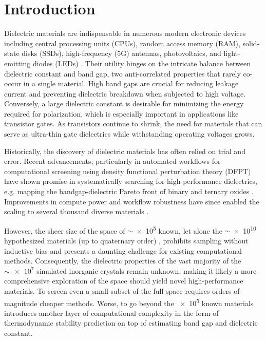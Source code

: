 \documentclass{article}
\begin{document}

\section{Introduction}
\label{sec:introduction}

Dielectric materials are indispensable in numerous modern electronic devices including central processing units (CPUs), random access memory (RAM), solid-state disks (SSDs), high-frequency (5G) antennas, photovoltaics, and light-emitting diodes (LEDs) \cite{wang_high_2018,ponceortiz_highk_2010}.
Their utility hinges on the intricate balance between dielectric constant and band gap, two anti-correlated properties that rarely co-occur in a single material.
High band gaps are crucial for reducing leakage current and preventing dielectric breakdown when subjected to high voltage.
Conversely, a large dielectric constant is desirable for minimizing the energy required for polarization, which is especially important in applications like transistor gates.
As transistors continue to shrink, the need for materials that can serve as ultra-thin gate dielectrics while withstanding operating voltages grows.

Historically, the discovery of dielectric materials has often relied on trial and error.
Recent advancements, particularly in automated workflows for computational screening using density functional perturbation theory (DFPT) have shown promise in systematically searching for high-performance dielectrics, e.g. mapping the bandgap-dielectric Pareto front of binary and ternary oxides \cite{yim_novel_2015}.
Improvements in compute power and workflow robustness have since enabled the scaling to several thousand diverse materials \cite{petousis_high-throughput_2017, petretto_highthroughput_2018,choudhary_highthroughput_2020}.

However, the sheer size of the space of $\sim$\num{e5} known, let alone the $\sim$\num{e10} hypothesized materials (up to quaternary order) \cite{davies_computational_2016}, prohibits sampling without inductive bias and presents a daunting challenge for existing computational methods.
Consequently, the dielectric properties of the vast majority of the $\sim\num{e7}$ simulated inorganic crystals remain unknown, making it likely a more comprehensive exploration of the space should yield novel high-performance materials.
To screen even a small subset of the full space requires orders of magnitude cheaper methods.
Worse, to go beyond the \num{e5} known materials introduces another layer of computational complexity in the form of thermodynamic stability prediction on top of estimating band gap and dielectric constant.
\end{document}
